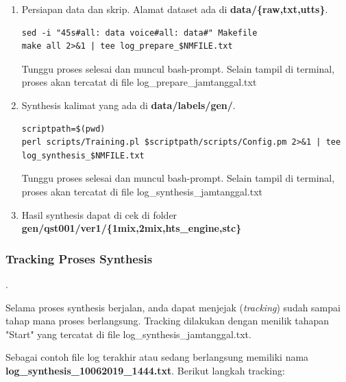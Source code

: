 \documentclass[12pt,]{article}
\begin{document}
\begin{enumerate}
		\item Persiapan data dan skrip.
		Alamat dataset ada di \textbf{data/\{raw,txt,utts\}}.
		\begin{verbatim}
sed -i "45s#all: data voice#all: data#" Makefile
make all 2>&1 | tee log_prepare_$NMFILE.txt
		\end{verbatim}

		Tunggu proses selesai dan muncul bash-prompt.
		Selain tampil di terminal, proses akan tercatat di file log\_prepare\_jamtanggal.txt

		\item Synthesis kalimat yang ada di \textbf{data/labels/gen/}.
		\begin{verbatim}
scriptpath=$(pwd)
perl scripts/Training.pl $scriptpath/scripts/Config.pm 2>&1 | tee log_synthesis_$NMFILE.txt
		\end{verbatim}

		Tunggu proses selesai dan muncul bash-prompt.
		Selain tampil di terminal, proses akan tercatat di file log\_synthesis\_jamtanggal.txt

		\item Hasil synthesis dapat di cek di folder \textbf{gen/qst001/ver1/\{1mix,2mix,hts\_engine,stc\}}

	\end{enumerate}

	\newpage
	\subsubsection{Tracking Proses Synthesis}.

	Selama proses synthesis berjalan, anda dapat menjejak (\textit{tracking}) sudah sampai tahap mana proses berlangsung.
	Tracking dilakukan dengan menilik tahapan "Start" yang tercatat di file log\_synthesis\_jamtanggal.txt.

	Sebagai contoh file log terakhir atau sedang berlangsung memiliki nama \textbf{log\_synthesis\_10062019\_1444.txt}.
	Berikut langkah tracking:
\end{document}
